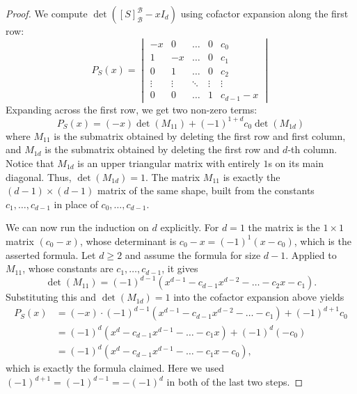 \begin{proof}
  We compute $\det([S]_{\mathcal{B}}^{\mathcal{B}} - x I_d)$ using cofactor expansion along the first row:
  \[
  P_S(x) = \begin{vmatrix}
    -x & 0 & \dots & 0 & c_0 \\
    1 & -x & \dots & 0 & c_1 \\
    0 & 1 & \dots & 0 & c_2 \\
    \vdots & \vdots & \ddots & \vdots & \vdots \\
    0 & 0 & \dots & 1 & c_{d-1} - x
  \end{vmatrix}
  \]
  Expanding across the first row, we get two non-zero terms:
  \[
  P_S(x) = (-x) \det(M_{11}) + (-1)^{1+d} c_0 \det(M_{1d})
  \]
  where $M_{11}$ is the submatrix obtained by deleting the first row and first column, and $M_{1d}$ is the submatrix obtained by deleting the first row and $d$-th column.
  Notice that $M_{1d}$ is an upper triangular matrix with entirely $1$s on its main diagonal. Thus, $\det(M_{1d}) = 1$. The matrix $M_{11}$ is exactly the $(d-1) \times (d-1)$ matrix of the same shape, built from the constants $c_1, \dots, c_{d-1}$ in place of $c_0, \dots, c_{d-1}$.

  We can now run the induction on $d$ explicitly. For $d = 1$ the matrix is the $1 \times 1$ matrix $(c_0 - x)$, whose determinant is $c_0 - x = (-1)^1 (x - c_0)$, which is the asserted formula. Let $d \ge 2$ and assume the formula for size $d-1$. Applied to $M_{11}$, whose constants are $c_1, \dots, c_{d-1}$, it gives
  \[ \det(M_{11}) = (-1)^{d-1} \left( x^{d-1} - c_{d-1}x^{d-2} - \dots - c_2 x - c_1 \right). \]
  Substituting this and $\det(M_{1d}) = 1$ into the cofactor expansion above yields
  \begin{align*}
    P_S(x) &= (-x) \cdot (-1)^{d-1} \left( x^{d-1} - c_{d-1}x^{d-2} - \dots - c_1 \right) + (-1)^{d+1} c_0 \\
    &= (-1)^{d} \left( x^{d} - c_{d-1}x^{d-1} - \dots - c_1 x \right) + (-1)^{d} (-c_0) \\
    &= (-1)^d \left( x^d - c_{d-1}x^{d-1} - \dots - c_1 x - c_0 \right),
  \end{align*}
  which is exactly the formula claimed. Here we used $(-1)^{d+1} = (-1)^{d-1} = -(-1)^d$ in both of the last two steps.
\end{proof}

